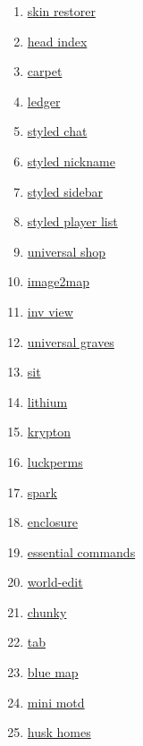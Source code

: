 \begin{enumerate}
    \item \href{https://modrinth.com/mod/skinrestorer}{skin restorer}
    \item \href{https://modrinth.com/mod/headindex}{head index}
    \item \href{https://modrinth.com/mod/carpet}{carpet}
    \item \href{https://modrinth.com/mod/ledger}{ledger}
    \item \href{https://modrinth.com/mod/styled-chat}{styled chat}
    \item \href{https://modrinth.com/mod/styled-nicknames}{styled nickname}
    \item \href{https://modrinth.com/mod/styled-sidebars}{styled sidebar}
    \item \href{https://modrinth.com/mod/styledplayerlist}{styled player list}
    \item \href{https://modrinth.com/mod/universal-shops}{universal shop}
    \item \href{https://modrinth.com/mod/image2map}{image2map}
    \item \href{https://modrinth.com/mod/invview}{inv view}
    \item \href{https://modrinth.com/mod/universal-graves}{universal graves}
    \item \href{https://modrinth.com/mod/bl4cks-sit}{sit}
    \item \href{https://modrinth.com/mod/lithium}{lithium}
    \item \href{https://modrinth.com/mod/krypton}{krypton}
    \item \href{https://modrinth.com/mod/luckperms}{luckperms}
    \item \href{https://modrinth.com/mod/spark}{spark}
    \item \href{https://modrinth.com/mod/enclosure}{enclosure}
    \item \href{https://modrinth.com/mod/essential-commands}{essential commands}
    \item \href{https://modrinth.com/plugin/worldedit}{world-edit}
    \item \href{https://modrinth.com/plugin/chunky}{chunky}
    \item \href{https://modrinth.com/plugin/tab-was-taken}{tab}
    \item \href{https://modrinth.com/plugin/bluemap}{blue map}
    \item \href{https://modrinth.com/plugin/minimotd}{mini motd}
    \item \href{https://modrinth.com/plugin/huskhomes}{husk homes}
\end{enumerate}


